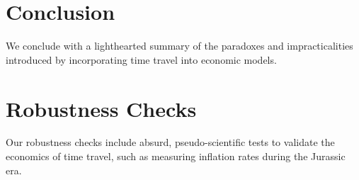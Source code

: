 \documentclass[11pt,a4paper]{article}
\begin{document}

\section{Conclusion}
We conclude with a lighthearted summary of the paradoxes and impracticalities introduced by incorporating time travel into economic models.


\appendix
\section{Robustness Checks}
Our robustness checks include absurd, pseudo-scientific tests to validate the economics of time travel, such as measuring inflation rates during the Jurassic era.




\end{document}
